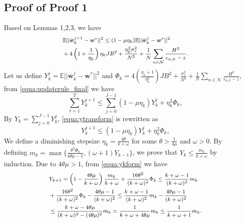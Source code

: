 \subsection{Proof of Proof 1}
\label{Proof_globalbound}
Based on Lemmas 1,2,3,  we have
\begin{equation} \footnotesize \label{equa:updaterule_final}
\begin{aligned}
&\mathbb{E}||\bar{\boldsymbol{w}}_k^{j+1} - \boldsymbol{w}^*||^2  
\leq (1-\mu\eta_k)\mathbb{E}||\bar{\boldsymbol{w}}_k^j - \boldsymbol{w}^*||^2  
\\&+ 4 \left(1+\frac{1}{\eta_k}\right) \eta_kJ B^2 + \frac{\eta_k^2\sigma_r^2}{N^2}
+ \frac{1}{N}\sum_{n\in\mathcal{N}}\frac{H^2}{\epsilon_{n,k}-z}.
\end{aligned}
\end{equation}
Let us define $ Y_k^j = \mathbb{E}||\bar{\boldsymbol{w}}_k^j - \boldsymbol{w}^*||^2$ and $\Phi_k = 4 \left(\frac{\eta_k+1}{\eta_k^2} \right)J B^2 + \frac{\sigma_r^2}{N^2}
+ \frac{1}{N}\sum_{n\in\mathcal{N}}\frac{H^2}{\epsilon_{n,k}-z}$, from \eqref{equa:updaterule_final} we have
\begin{equation}\label{equa:ytransform}
\sum_{t=1}^{T}Y_k^{j+1} \leq \sum_{j=0}^{J-1} (1-\mu\eta_k)Y_k^j + \eta_k^2\Phi_k,
\end{equation}
By $Y_k = \sum_{j=0}^{J-1}Y_k^j $, \eqref{equa:ytransform} is rewritten as
\begin{equation}\label{equa:ykform}
Y_k^{j+1} \leq (1-\mu\eta_k)Y_k^j  + \eta_k^2\Phi_k,   
\end{equation}
We define a diminishing stepsize $\eta_k = \frac{4\theta}{k+\omega}$ for some $\theta >\frac{1}{4\mu}$ and $\omega >0$. By defining $m_k =\max \{\frac{\theta^2\Phi_k}{4\theta\mu-1}, (\omega+1)Y_{k-1}\}$, we prove that $Y_k \leq \frac{m_k}{k+\omega}$ by induction. Due to $4\theta\mu >1$, from \eqref{equa:ykform} we have
\begin{equation} \footnotesize  \label{equa:_final}
\begin{aligned}
&Y_{k+1} = \left(1-\frac{4\theta\mu}{k+\omega} \right) \frac{m_k}{k+\omega} +  \frac{16\theta^2}{(k+\omega)^2}\Phi_k
 \leq \frac{k+\omega-1}{(k+\omega)^2}m_k 
 \\&+ \frac{16\theta^2}{(k+\omega)^2}\Phi_k
- \frac{4\theta\mu-1}{(k+\omega)^2} 
 \leq \frac{k+\omega-1}{(k+\omega)^2}m_k - \frac{4\theta\mu-1}{(k+\omega)^2}
  \\&\leq \frac{k+\omega-4\theta\mu}{(k+\omega)^2 - (4\theta\mu)^2}m_k 
 = \frac{1}{k+\omega+4\theta\mu}m_k \leq \frac{1}{k+\omega+1}m_k.
\end{aligned}
\end{equation}
